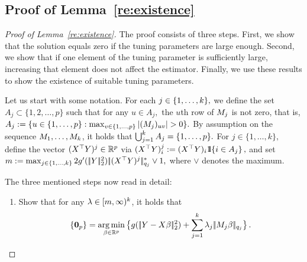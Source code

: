 \documentclass[bj]{imsart}
\newcommand{\normtwo}[1]{\ensuremath{\!|\!| #1 | \! |_{2}}}
\newcommand{\normqj}[1]{\ensuremath{\!|\!| #1 | \! |_{q_j}}}
\newcommand{\normqjd}[1]{\ensuremath{\!|\!| #1 | \! |_{q_j}^*}}
\newcommand{\1}{{\rm 1}\mskip -4,5mu{\rm l} }
\newcommand{\argmin}{\mathop{\mathrm{arg\,min}}}
\def\R{\mathbb{R}}
\begin{document}
\subsection{Proof of Lemma~\ref{re:existence}}
\begin{proof}[Proof of Lemma~\ref{re:existence}]
The proof consists of three steps.  First, we show that the solution equals zero if the tuning parameters are large enough. Second, we show that if one element of the tuning parameter is sufficiently large, increasing that element does not affect the estimator. Finally, we use these results to show the existence of suitable tuning parameters.

Let us start with some notation. For each $j\in\{1,\dots,k\},$ we define the set  $A_j\subset \{1,2,\dots,p\}$ such that for any $u
\in A_j,$ the $u$th row of $M_j$ is not zero, that is, $A_j:=\{u\in\{1,\dots,p\}:\max_{v\in\{1,\dots,p\}}|(\fusedmatrix_{j})_{uv}|>0\}.$ By assumption on the sequence  $M_1,\dots,M_{k}$, it holds that $\bigcup_{j=1}^{k}A_j=\{1,\dots,p\}.$ For $j\in\{1,\dots,k\},$ define the vector $(\design^\top \outcome)^j\in\R^p$  via $(\design^\top \outcome)^j_i:=(\design^\top \outcome)_i\1\{i\in A_j\}\,,$ and set $m:=\max_{j\in\{1,\dots,\numbergroups\}}2 g'(\,\normtwo{\outcome}^2)\,\normqjd{(\design^\top \outcome)^j}\vee 1,$ where $\vee$ denotes the maximum. 

The three mentioned steps now read in detail:
\begin{enumerate}
\item Show that for any $\lambda\in[m,\infty)^{k}$, it holds that
\begin{align*}
\{\bold{0}_p\}=\argmin_{\beta\in\R^p}\big\{g(\,\normtwo{\outcome-\design\beta}^2)+\sum_{j=1}^\numbergroups \lambda_j\,\normqj{\fusedmatrix_j\beta}\big\}\,.
\end{align*}


\end{enumerate}
\end{proof}
\end{document}
